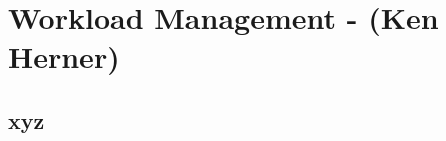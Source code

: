 \chapter{Workload Management  - (Ken Herner)}
\label{ch:wkload}

\section{xyz}
\label{sec:wkload:xyz}  %
